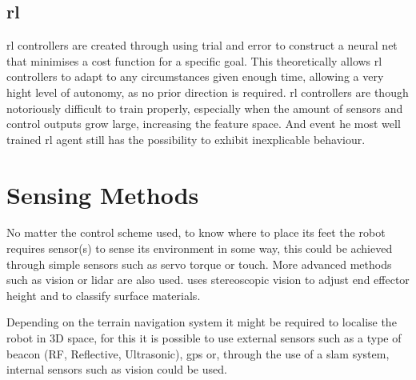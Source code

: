     \subsection{\acl{rl}}
    \ac{rl} controllers are created through using trial and error to construct a neural net that minimises a cost function for a specific goal. This theoretically allows \ac{rl} controllers to adapt to any circumstances given enough time, allowing a very hight level of autonomy, as no prior direction is required. \ac{rl} controllers are though notoriously difficult to train properly, especially when the amount of sensors and control outputs grow large, increasing the feature space. And event he most well trained \ac{rl} agent still has the possibility to exhibit inexplicable behaviour.
    
\section{Sensing Methods}
    No matter the control scheme used, to know where to place its feet the robot requires sensor(s) to sense its environment in some way,
    this could be achieved through simple sensors such as servo torque or touch. More advanced methods such as vision or \ac{lidar} are also used.
    \cite{homberger2017terrain} uses stereoscopic vision to adjust end effector height and to classify surface materials.

    Depending on the terrain navigation system it might be required to localise the robot in 3D space, for this it is possible to use external sensors such as a type of beacon (RF, Reflective, Ultrasonic), \ac{gps} or, through the use of a \ac{slam} system, internal sensors such as vision could be used.




